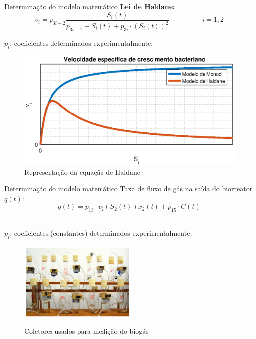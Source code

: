 \documentclass[10pt]{beamer}
\begin{document}
\begin{frame}[fragile]{Determinação do modelo matemático}
\textbf{Lei de Haldane:}
\begin{equation*}
v_i = p_{3i-2}\frac{S_i(t)}{p_{3i-1}+S_i(t)+p_{3i}\cdot(S_i(t))^2}  \hspace{2cm} i=1,2
\end{equation*}
\vspace{20pt}
\begin{footnotesize}
$p_i$: coeficientes determinados experimentalmente;
\end{footnotesize}
    \begin{center}
    \begin{figure}[b]
    \includegraphics[width=.8\textwidth]{figures/velocidade.eps}	
     \caption{Representação da equação de Haldane}
    \end{figure}
     \end{center}
\end{frame}

\begin{frame}[fragile]{Determinação do modelo matemático}
Taxa de fluxo de gás na saída do biorreator $q(t)$:\\
\begin{equation*}
q(t) = p_{13}\cdot v_{2}(S_{2}(t))x_2(t) + p_{15}\cdot C(t)
\end{equation*}
\\
\begin{footnotesize}
$p_i$: coeficientes (constantes) determinados experimentalmente;
\end{footnotesize}

    \begin{center}
    \begin{figure}[b]
    \includegraphics[width=0.5\textwidth]{figures/coletores.png}+
     \caption{Coletores usados para medição do biogás \cite{eckhard}}
    \end{figure}
     \end{center}

\end{frame}
\end{document}
